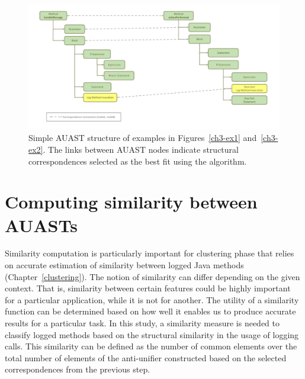 \begin{figure} [H]
  \centering\includegraphics [width = \textwidth]{Drawing4/FinalCorr.pdf}
  \caption{Simple AUAST structure of examples in Figures~\ref{ch3-ex1} and~\ref{ch3-ex2}. The links between AUAST nodes indicate structural correspondences selected as the best fit using the  algorithm.}
  \label{fig:AUASTs}
\end{figure}

\section{Computing similarity between AUASTs} \label{meth-similarity}
Similarity computation is particularly important for clustering phase that relies on accurate estimation of similarity between logged Java methods (Chapter~\ref{clustering}). The notion of similarity can differ depending on the given context. That is, similarity between certain features could be highly important for a particular application, while it is not for another. The utility of a similarity function can be determined based on how well it enables us to produce accurate results for a particular task. In this study, a similarity measure is needed to classify logged methods based on the structural similarity in the usage of logging calls. This similarity can be defined as the number of common elements over the total number of elements of the anti-unifier constructed based on the selected correspondences from the previous step.  

